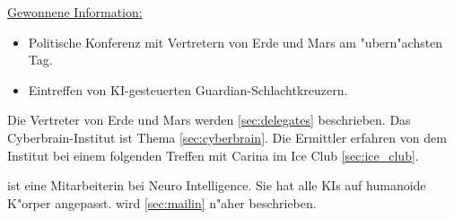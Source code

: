 \begin{remarks}
	\underline{Gewonnene Information:}
	
	\begin{itemize}
		\item Politische Konferenz mit Vertretern von Erde und Mars am "ubern"achsten Tag.
		\item Eintreffen von KI-gesteuerten Guardian-Schlachtkreuzern.
	\end{itemize}

	Die Vertreter von Erde und Mars werden \cref{sec:delegates} beschrieben. Das Cyberbrain-Institut ist Thema \cref{sec:cyberbrain}. Die Ermittler erfahren von dem Institut bei einem folgenden Treffen mit Carina im Ice Club \cref{sec:ice_club}.

	\ml{} ist eine Mitarbeiterin bei Neuro Intelligence. Sie hat alle KIs auf humanoide K"orper angepasst. \ml{} wird \cref{sec:mailin} n"aher beschrieben.
\end{remarks}
